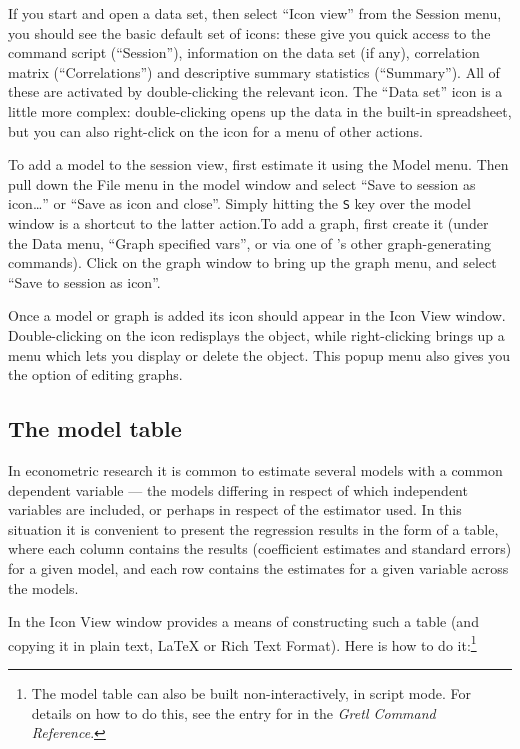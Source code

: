 If you start  and open a data set, then select ``Icon
view'' from the Session menu, you should see the basic default set of
icons: these give you quick access to the command script
(``Session''), information on the data set (if any), correlation
matrix (``Correlations'') and descriptive summary statistics
(``Summary''). All of these are activated by double-clicking the
relevant icon.  The ``Data set'' icon is a little more complex:
double-clicking opens up the data in the built-in spreadsheet, but you
can also right-click on the icon for a menu of other actions.

To add a model to the session view, first estimate it using the Model
menu.  Then pull down the File menu in the model window and select
``Save to session as icon\dots{}'' or ``Save as icon and close''.
Simply hitting the \verb+S+ key over the model window is a shortcut to
the latter action.To add a graph, first create it (under the Data
menu, ``Graph specified vars'', or via one of 's other
graph-generating commands).  Click on the graph window to bring up the
graph menu, and select ``Save to session as icon''.

Once a model or graph is added its icon should appear in the Icon View
window.  Double-clicking on the icon redisplays the object, while
right-clicking brings up a menu which lets you display or delete the
object.  This popup menu also gives you the option of editing graphs.

\subsection{The model table}
\label{model-table}


In econometric research it is common to estimate several models with a
common dependent variable --- the models differing in respect of which
independent variables are included, or perhaps in respect of the
estimator used.  In this situation it is convenient to present the
regression results in the form of a table, where each column contains
the results (coefficient estimates and standard errors) for a given
model, and each row contains the estimates for a given variable across
the models.  

In the Icon View window  provides a means of constructing
such a table (and copying it in plain text, {\LaTeX} or Rich Text
Format).  Here is how to do it:\footnote{The model table can also be
  built non-interactively, in script mode.  For details on how to do
  this, see the entry for  in the \emph{Gretl Command
    Reference}.  }
      
